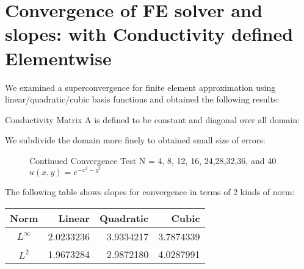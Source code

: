 \documentclass[11pt, notitlepage,  letterpaper]{article}
\begin{document}
%
\author{Seungkeol\ Choe \\ skchoe@cs.utah.edu}

\renewcommand{\today}{Apr 30th, 2004}





\section{Convergence of FE solver and slopes: with Conductivity defined Elementwise}

\medskip %
\renewcommand{\arraystretch}{1.5}

We examined a superconvergence for finite element approximation using linear/quadratic/cubic basis functions and obtained the following results:


Conductivity Matrix A is defined to be constant and diagonal over all domain:

We subdivide the domain more finely to obtained small size of errors:

\begin{figure}[h]
    \begin{center}
    \caption{\label{scrvsol2}Continued Convergence Test N = 4, 8, 12, 16, 24,28,32,36, and 40 $u(x,y) = e^{- x^2 - y^2}$}
    \end{center}
\end{figure}

The following table shows slopes for convergence in terms of 2 kinds of norm:
\begin{center}
\begin{tabular}{|c||r|r|r|}  \hline
Norm  & Linear & Quadratic & Cubic\\ \hline \hline
$L^{\infty}$&2.0233236&3.9334217&3.7874339 \\\hline
$L^2$&1.9673284&2.9872180&4.0287991\\\hline
\end{tabular}
\end{center}

\newpage
\end{document}
